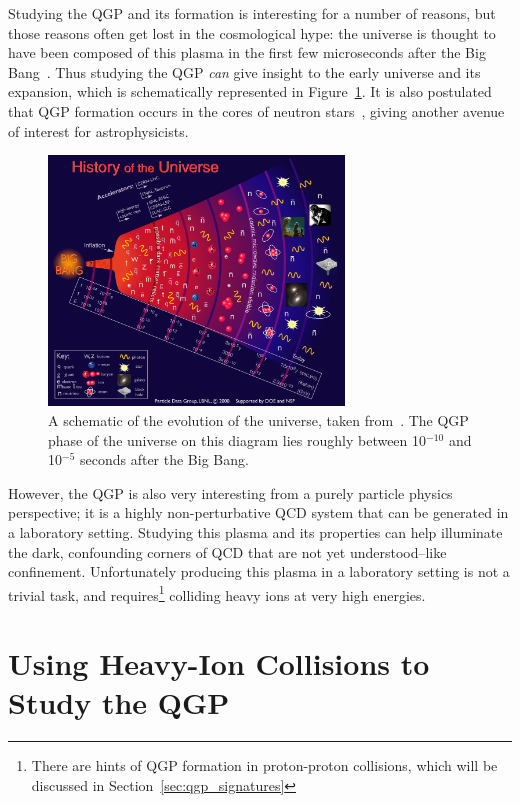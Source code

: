 Studying the QGP and its formation is interesting for a number of reasons, but those reasons often get lost in the cosmological hype: the universe is thought to have been composed of this plasma in the first few microseconds after the Big Bang~\cite{QGP3}. Thus studying the QGP \textit{can} give insight to the early universe and its expansion, which is schematically represented in Figure~\ref{fig:qgp_universe}. It is also postulated that QGP formation occurs in the cores of neutron stars~\cite{QGPNeutron}, giving another avenue of interest for astrophysicists.

\begin{figure}
    \centering
    \includegraphics[width=0.7\textwidth]{figures/introduction/qgp_universe.jpg}
    \caption{A schematic of the evolution of the universe, taken from~\cite{PDG}. The QGP phase of the universe on this diagram lies roughly between 10$^{-10}$ and 10$^{-5}$ seconds after the Big Bang.}
    \label{fig:qgp_universe}
\end{figure}

However, the QGP is also very interesting from a purely particle physics perspective; it is a highly non-perturbative QCD system that can be generated in a laboratory setting. Studying this plasma and its properties can help illuminate the dark, confounding corners of QCD that are not yet understood--like confinement. Unfortunately producing this plasma in a laboratory setting is not a trivial task, and requires\footnote{There are hints of QGP formation in proton-proton collisions, which will be discussed in Section~\ref{sec:qgp_signatures}} colliding heavy ions at very high energies.


\section{Using Heavy-Ion Collisions to Study the QGP}
\label{sec:heavy_ion_collisions}

